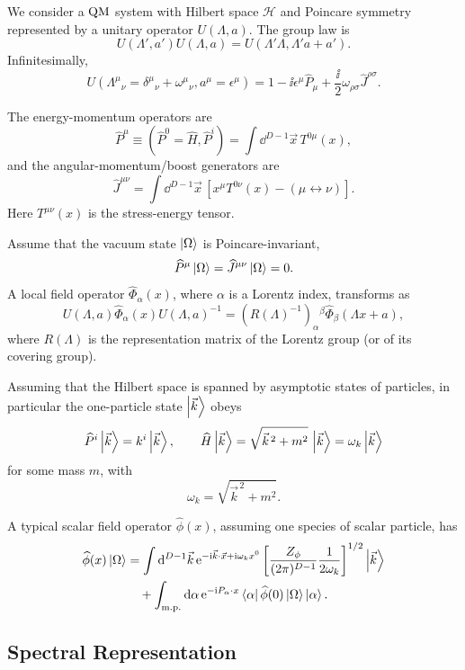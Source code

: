 We consider a \(\mathrm{QM}\) system with Hilbert space \(\mathcal H\) and
Poincare symmetry represented by a unitary operator \(U(\Lambda,a)\).
The group law is
\[
  U(\Lambda',a')U(\Lambda,a)
  =
  U(\Lambda'\Lambda,\Lambda'a+a').
\]
Infinitesimally,
\[
  U\!\left(\Lambda^\mu{}_\nu=\delta^\mu{}_\nu+\omega^\mu{}_\nu,
  a^\mu=\epsilon^\mu\right)
  =
  1-\ii\epsilon^\mu \widehat P_\mu
  +\frac{\ii}{2}\omega_{\rho\sigma}\widehat J^{\rho\sigma}.
\]

The energy-momentum operators are
\[
  \widehat P^\mu\equiv(\widehat P^0=\widehat H,\widehat P^i)
  =
  \int \dd^{D-1}\vec x\,T^{0\mu}(x),
\]
and the angular-momentum/boost generators are
\[
  \widehat J^{\mu\nu}
  =
  \int \dd^{D-1}\vec x\,
  \left[x^\mu T^{0\nu}(x)-(\mu\leftrightarrow\nu)\right].
\]
Here \(T^{\mu\nu}(x)\) is the stress-energy tensor.

Assume that the vacuum state \(\ket{\Omega}\) is Poincare-invariant,
\[
  \widehat P^\mu\ket{\Omega}
  =
  \widehat J^{\mu\nu}\ket{\Omega}
  =
  0.
\]
A local field operator \(\widehat\Phi_\alpha(x)\), where \(\alpha\) is a
Lorentz index, transforms as
\[
  U(\Lambda,a)\widehat\Phi_\alpha(x)U(\Lambda,a)^{-1}
  =
  \left(R(\Lambda)^{-1}\right)_\alpha{}^\beta
  \widehat\Phi_\beta(\Lambda x+a),
\]
where \(R(\Lambda)\) is the representation matrix of the Lorentz group
(or of its covering group).

Assuming that the Hilbert space is spanned by asymptotic states of
particles, in particular the one-particle state \(\ket{\vec k}\) obeys
\[
  \widehat P^i\ket{\vec k}=k^i\ket{\vec k},
  \qquad
  \widehat H\ket{\vec k}
  =
  \sqrt{\vec k^{\,2}+m^2}\,\ket{\vec k}
  =
  \omega_k\ket{\vec k}
\]
for some mass \(m\), with
\[
  \omega_k=\sqrt{\vec k^{\,2}+m^2}.
\]

A typical scalar field operator \(\widehat\phi(x)\), assuming one species
of scalar particle, has
\[
\begin{aligned}
  \widehat\phi(x)\ket{\Omega}
  &=
  \int \mathrm{d}^{D-1}\vec k\,
  \mathrm{e}^{-\mathrm{i}\vec k\cdot\vec x+\mathrm{i}\omega_k x^0}
  \left[
    \frac{Z_\phi}{(2\pi)^{D-1}}\frac{1}{2\omega_k}
  \right]^{1/2}
  \ket{\vec k}
\\
  &\quad
  +\int_{\mathrm{m.p.}}\mathrm{d}\alpha\,
  \mathrm{e}^{-\mathrm{i} P_\alpha\cdot x}
  \bra{\alpha}\widehat\phi(0)\ket{\Omega}\ket{\alpha}.
\end{aligned}
\]

\subsection{Spectral Representation}

